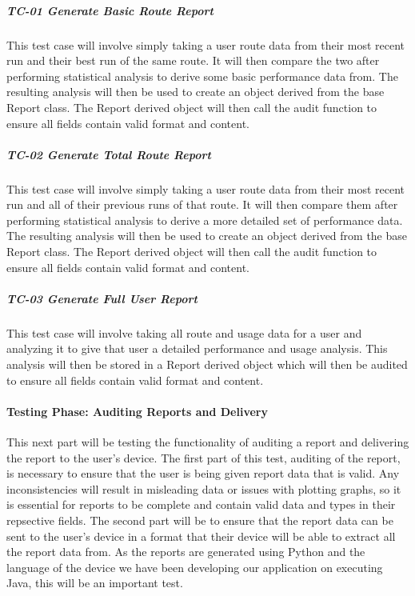 \documentclass{article}
\begin{document}
\subparagraph{TC-01 Generate Basic Route Report}
This test case will involve simply taking a user route data from their most recent run and their best run of the same route. It will then compare the two after performing statistical analysis to derive some basic performance data from. The resulting analysis will then be used to create an object derived from the base Report class. The Report derived object will then call the audit function to ensure all fields contain valid format and content.

\subparagraph{TC-02 Generate Total Route Report}
This test case will involve simply taking a user route data from their most recent run and all of their previous runs of that route. It will then compare them after performing statistical analysis to derive a more detailed set of performance data. The resulting analysis will then be used to create an object derived from the base Report class. The Report derived object will then call the audit function to ensure all fields contain valid format and content.

\subparagraph{TC-03 Generate Full User Report}
This test case will involve taking all route and usage data for a user and analyzing it to give that user a detailed performance and usage analysis. This analysis will then be stored in a Report derived object which will then be audited to ensure all fields contain valid format and content.

\paragraph{Testing Phase: Auditing Reports and Delivery}
This next part will be testing the functionality of auditing a report and delivering the report to the user's device. The first part of this test, auditing of the report, is necessary to ensure that the user is being given report data that is valid. Any inconsistencies will result in misleading data or issues with plotting graphs, so it is essential for reports to be complete and contain valid data and types in their repsective fields. The second part will be to ensure that the report data can be sent to the user's device in a format that their device will be able to extract all the report data from. As the reports are generated using Python and the language of the device we have been developing our application on executing Java, this will be an important test.
\end{document}
